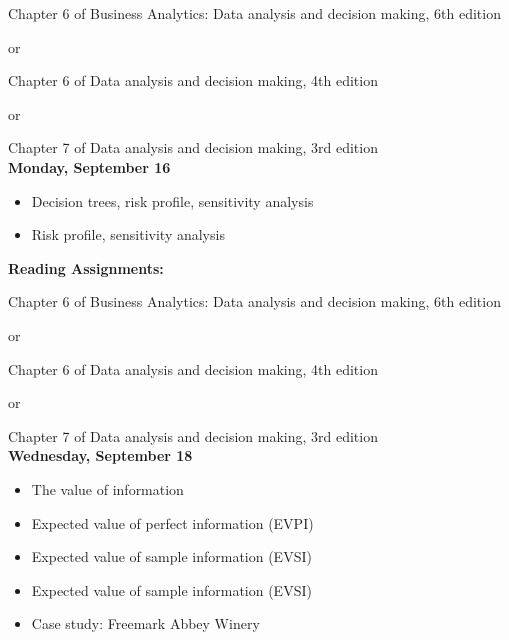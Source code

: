 \documentclass[11pt]{article}
\begin{document}
Chapter 6 of Business Analytics: Data analysis and decision making, 6th edition

or 

Chapter 6 of Data analysis and decision making, 4th edition

or 

Chapter 7 of  Data analysis and decision making, 3rd edition\\



\vspace{5mm}
\noindent\textbf{\large Monday, September 16} 	

\begin{itemize}
\item Decision trees, risk profile, sensitivity analysis
\item Risk profile, sensitivity analysis
\end{itemize}
\noindent\textbf{Reading Assignments:}

Chapter 6 of Business Analytics: Data analysis and decision making, 6th edition

or

Chapter 6 of Data analysis and decision making, 4th edition

or 

Chapter 7 of  Data analysis and decision making, 3rd edition\\



\vspace{5mm}
\noindent\textbf{\large Wednesday, September 18} 	

\begin{itemize}
\item The value of information
\item Expected value of perfect information (EVPI)
\item Expected value of sample information (EVSI)

\item Expected value of sample information (EVSI)

\item Case study: Freemark Abbey Winery


\end{itemize}
\end{document}
